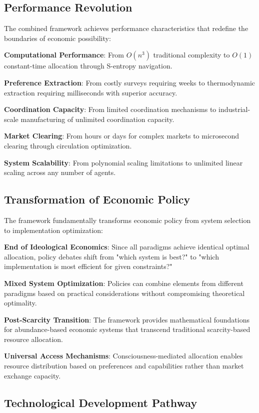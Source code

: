 \documentclass[12pt,a4paper]{article}
\begin{document}
\subsection{Performance Revolution}

The combined framework achieves performance characteristics that redefine the boundaries of economic possibility:

\textbf{Computational Performance}: From $O(n^3)$ traditional complexity to $O(1)$ constant-time allocation through S-entropy navigation.

\textbf{Preference Extraction}: From costly surveys requiring weeks to thermodynamic extraction requiring milliseconds with superior accuracy.

\textbf{Coordination Capacity}: From limited coordination mechanisms to industrial-scale manufacturing of unlimited coordination capacity.

\textbf{Market Clearing}: From hours or days for complex markets to microsecond clearing through circulation optimization.

\textbf{System Scalability}: From polynomial scaling limitations to unlimited linear scaling across any number of agents.

\subsection{Transformation of Economic Policy}

The framework fundamentally transforms economic policy from system selection to implementation optimization:

\textbf{End of Ideological Economics}: Since all paradigms achieve identical optimal allocation, policy debates shift from "which system is best?" to "which implementation is most efficient for given constraints?"

\textbf{Mixed System Optimization}: Policies can combine elements from different paradigms based on practical considerations without compromising theoretical optimality.

\textbf{Post-Scarcity Transition}: The framework provides mathematical foundations for abundance-based economic systems that transcend traditional scarcity-based resource allocation.

\textbf{Universal Access Mechanisms}: Consciousness-mediated allocation enables resource distribution based on preferences and capabilities rather than market exchange capacity.

\subsection{Technological Development Pathway}
\end{document}
